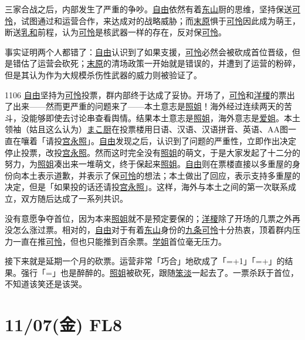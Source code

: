 三家合战之后，内部发生了严重的争吵。\uline{自由}依然有着\uline{东山}厨的思维，坚持保送\uline{可怜}，试图通过和运营合作，来达成对的战略威胁；而\uline{末原}惧于\uline{可怜}因此成为萌王，断送\uline{乳和}前程，认为\uline{可怜}是核武器一样的存在，反对保\uline{可怜}。

事实证明两个人都错了：\uline{自由}认识到了如果支援，\uline{可怜}必然会被砍成首位晋级，但是错估了运营会砍死；\uline{末原}的清场政策一开始就是错误的，并遭到了运营的粉碎，但是其认为作为大规模杀伤性武器的威力则被验证了。

1106 \uline{自由}坚持为\uline{可怜}投票，群内部终于达成了妥协。开场了，\uline{可怜}和\uline{洋榎}的票出了出来——然而更严重的问题来了——本土意志是\uline{照姐}！海外经过连续两天的苦斗，没能够即使去讨论串查看舆情。结果本土意志是\uline{照姐}，海外意志是\uline{爱姐}。本土领袖（姑且这么认为）\uline{まこ厨}在投票楼用日语、汉语、汉语拼音、英语、AA图一直在嚷着「请投\uline{宫永照}」。\uline{自由}发现之后，认识到了问题的严重性，立即作出决定停止投票，改投\uline{宫永照}。然而这时完全没有\uline{照姐}的萌文，于是大家发起了十二分的努力，为\uline{照姐}凑出来一堆萌文，终于保起来\uline{照姐}。\uline{自由}则在票楼直接以多重屋的身份向本土表示道歉，并表示了保\uline{可怜}的想法；本土做出了回应，表示支持多重屋的决定，但是「如果投的话还请投\uline{宫永照}」。这样，海外与本土之间的第一次联系成立，双方随后达成了一系列共识。

没有意愿争夺首位，因为本来\uline{照姐}就不是预定要保的；\uline{洋榎}除了开场的几票之外再没怎么涨过票。相对的，\uline{自由}对于有着\uline{东山}身份的\uline{九条可怜}十分热衷，顶着群内压力一直在推\uline{可怜}，但也只能推到百余票。\uline{学姐}首位毫无压力。

接下来就是延期一个月的砍票。运营非常「巧合」地砍成了「=+1」「=+」的结果。强行「=」也是醉醉的。\uline{照姐}被砍死，跟随\uline{笨淡}一起去了。一票杀跃于首位，不知道该笑还是该哭。
\clearpage
\section{11/07(金) FL8}



